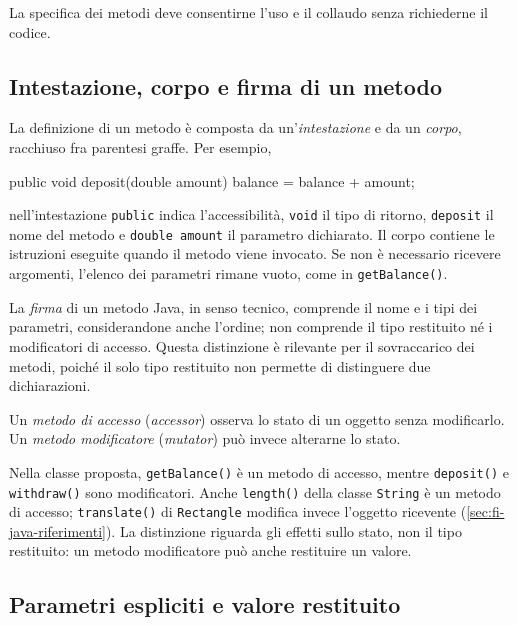 La specifica dei metodi deve consentirne l'uso e il collaudo
senza richiederne il codice.

\subsection{Intestazione, corpo e firma di un metodo}
\label{sec:fi-java-classi-firma}

La definizione di un metodo è composta da un'\emph{intestazione}
e da un \emph{corpo}, racchiuso fra parentesi graffe. Per esempio,

\begin{unipdcode}[language=Java]
public void deposit(double amount) {
    balance = balance + amount;
}
\end{unipdcode}

nell'intestazione \texttt{public} indica l'accessibilità,
\texttt{void} il tipo di ritorno, \texttt{deposit} il nome del
metodo e \texttt{double amount} il parametro dichiarato. Il corpo
contiene le istruzioni eseguite quando il metodo viene invocato.
Se non è necessario ricevere argomenti, l'elenco dei parametri
rimane vuoto, come in \texttt{getBalance()}.

La \emph{firma} di un metodo Java, in senso tecnico, comprende il
nome e i tipi dei parametri, considerandone anche l'ordine; non
comprende il tipo restituito né i modificatori di accesso.
Questa distinzione è rilevante per il sovraccarico dei metodi,
poiché il solo tipo restituito non permette di distinguere
due dichiarazioni.

\begin{definition}
\label{def:fi-java-classi-accessori}
Un \emph{metodo di accesso} (\emph{accessor}) osserva lo stato di
un oggetto senza modificarlo. Un \emph{metodo modificatore}
(\emph{mutator}) può invece alterarne lo stato.
\end{definition}

Nella classe proposta, \texttt{getBalance()} è un metodo di
accesso, mentre \texttt{deposit()} e \texttt{withdraw()} sono
modificatori. Anche \texttt{length()} della classe \texttt{String}
è un metodo di accesso; \texttt{translate()} di
\texttt{Rectangle} modifica invece l'oggetto ricevente
(\cref{sec:fi-java-riferimenti}). La distinzione riguarda gli
effetti sullo stato, non il tipo restituito: un metodo modificatore
può anche restituire un valore.

\clearpage

\subsection{Parametri espliciti e valore restituito}
\label{sec:fi-java-classi-parametri}

